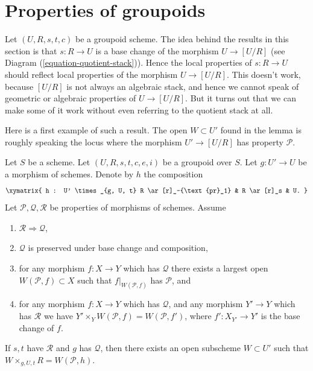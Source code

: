 \section{Properties of groupoids}
\label{section-technical-lemma}

\noindent
Let $(U, R, s, t, c)$ be a groupoid scheme.
The idea behind the results in this section is that $s: R \to U$
is a base change of the morphism $U \to [U/R]$ (see
Diagram (\ref{equation-quotient-stack})).
Hence the local properties of $s : R \to U$ should reflect local
properties of the morphism $U \to [U/R]$.
This doesn't work, because $[U/R]$ is not always an algebraic stack, and
hence we cannot speak of geometric or algebraic properties of
$U \to [U/R]$.
But it turns out that we can make some of it work without even
referring to the quotient stack at all.

\medskip\noindent
Here is a first example of such a result. The open $W \subset U'$ found
in the lemma is roughly speaking the locus where the morphism
$U' \to [U/R]$ has property $\mathcal{P}$.

\begin{lemma}
\label{lemma-local-source}
Let $S$ be a scheme.
Let $(U, R, s, t, c, e, i)$ be a groupoid over $S$.
Let $g : U' \to U$ be a morphism of schemes.
Denote by $h$ the composition
$$
\xymatrix{
h : U' \times_{g, U, t} R \ar[r]_-{\text{pr}_1} & R \ar[r]_s & U.
}
$$
Let $\mathcal{P}, \mathcal{Q}, \mathcal{R}$ be properties of morphisms
of schemes. Assume
\begin{enumerate}
\item $\mathcal{R} \Rightarrow \mathcal{Q}$,
\item $\mathcal{Q}$ is preserved under base change and composition,
\item for any morphism $f : X \to Y$ which has $\mathcal{Q}$ there exists a
largest open $W(\mathcal{P}, f) \subset X$ such that $f|_{W(\mathcal{P}, f)}$
has $\mathcal{P}$, and
\item for any morphism $f : X \to Y$ which has $\mathcal{Q}$,
and any morphism $Y' \to Y$ which has $\mathcal{R}$ we have
$Y' \times_Y W(\mathcal{P}, f) = W(\mathcal{P}, f')$, where
$f' : X_{Y'} \to Y'$ is the base change of $f$.
\end{enumerate}
If $s, t$ have $\mathcal{R}$ and $g$ has $\mathcal{Q}$, then
there exists an open subscheme $W \subset U'$ such that
$W \times_{g, U, t} R = W(\mathcal{P}, h)$.
\end{lemma}

